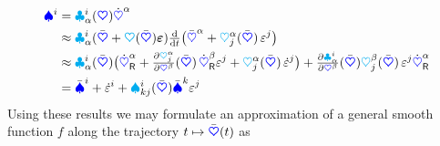 \begin{align}
 \sysVelCoeff{\LidxI} &= \kinBasisMatCoeff{\LidxI}{\GidxI}(\sysCoord) \sysCoordCoeffd{\GidxI}
\nonumber\\
 &\approx \kinBasisMatCoeff{\LidxI}{\GidxI}(\sysCoordB + \kinMat(\sysCoordB) \LinErrorCoord) \tdiff{t} \big( \sysCoordCoeffB{\GidxI} + \kinMatCoeff{\GidxI}{\LidxII}(\sysCoordB) \, \LinErrorCoordCoeff{\LidxII} \big)
\nonumber\\
 &\approx \kinBasisMatCoeff{\LidxI}{\GidxI}(\sysCoordB) \big( \sysCoordCoeffRd{\GidxI} + \tpdiff[\kinMatCoeff{\GidxI}{\LidxII}]{\sysCoordCoeff{\GidxII}}(\sysCoordB) \, \sysCoordCoeffRd{\GidxII} \LinErrorCoordCoeff{\LidxII} + \kinMatCoeff{\GidxI}{\LidxII}(\sysCoordB) \, \LinErrorCoordCoeffd{\LidxII} \big)
  + \tpdiff[\kinBasisMatCoeff{\LidxI}{\GidxI}]{\sysCoordCoeff{\GidxII}}(\sysCoordB)  \kinMatCoeff{\GidxII}{\LidxII}(\sysCoordB) \, \LinErrorCoordCoeff{\LidxII} \sysCoordCoeffRd{\GidxI}
\nonumber\\
 &= \sysVelCoeffB{\LidxI} + \LinErrorCoordCoeffd{\LidxI} + \BoltzSym{\LidxI}{\LidxIII}{\LidxII}(\sysCoordB) \sysVelCoeffB{\LidxIII} \LinErrorCoordCoeff{\LidxII}
\end{align}
Using these results we may formulate an approximation of a general smooth function $f$ along the trajectory $t \mapsto \sysCoordB(t)$ as 
